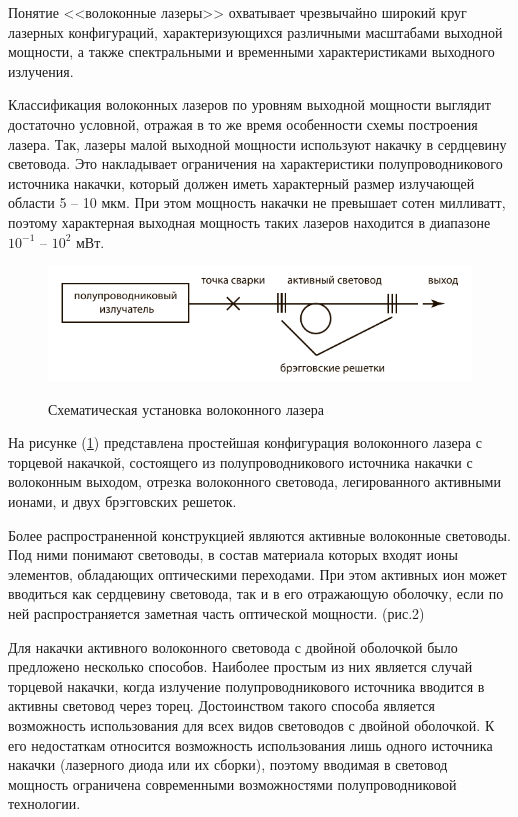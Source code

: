 \documentclass[14pt,pscyr,titlepage]{hedreport}
\begin{document}
		Понятие <<волоконные лазеры>> охватывает чрезвычайно широкий круг 
		лазерных конфигураций, характеризующихся различными масштабами 
		выходной мощности, а также спектральными и временными характеристиками 
		выходного излучения. 

		Классификация волоконных лазеров по уровням выходной мощности выглядит 
		достаточно условной, отражая в то же время особенности схемы 
		построения лазера. Так, лазеры малой выходной мощности используют 
		накачку в сердцевину световода. Это накладывает ограничения на 
		характеристики полупроводникового источника накачки, который должен 
		иметь характерный размер излучающей области 5 -- 10 мкм. При этом 
		мощность накачки не превышает сотен милливатт, поэтому характерная 
		выходная мощность таких лазеров находится в диапазоне 
		\( 10^{-1} \) -- \( 10^{2} \) мВт.  

		\begin{figure}[!ht]
			\center
			\includegraphics[width=.8\textwidth]{fiber_laser} \\
			\caption{Схематическая установка волоконного лазера}
			\label{img:fiber01}
		\end{figure}

		На рисунке (\ref{img:fiber01}) представлена простейшая конфигурация 
		волоконного лазера с торцевой накачкой, состоящего из 
		полупроводникового источника накачки с волоконным выходом, отрезка 
		волоконного световода, легированного активными ионами, и двух 
		брэгговских решеток. 

		Более распространенной конструкцией являются активные волоконные 
		световоды. Под ними понимают световоды, в состав материала которых 
		входят ионы элементов, обладающих оптическими переходами. При этом 
		активных ион может вводиться как сердцевину световода, так и в его 
		отражающую оболочку, если по ней распространяется заметная часть 
		оптической мощности. (рис.2)

		Для накачки активного волоконного световода с двойной оболочкой было 
		предложено несколько способов. Наиболее простым из них является случай 
		торцевой накачки, когда излучение полупроводникового источника 
		вводится в активны световод через торец. Достоинством такого способа 
		является возможность использования для всех видов световодов с 
		двойной оболочкой. К его недостаткам относится возможность 
		использования лишь одного источника накачки (лазерного диода или их 
		сборки), поэтому вводимая в световод мощность ограничена современными 
		возможностями полупроводниковой технологии.
\end{document}

